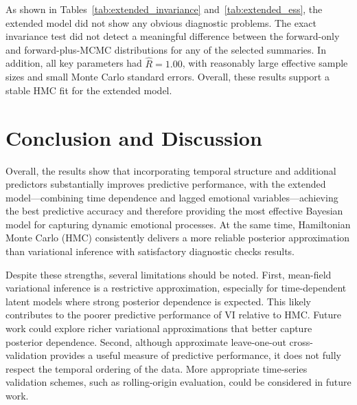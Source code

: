\documentclass[12pt,letterpaper,fleqn]{article}
\begin{document}
As shown in Tables~\ref{tab:extended_invariance} and~\ref{tab:extended_ess}, the extended model did not show any obvious diagnostic problems. The exact invariance test did not detect a meaningful difference between the forward-only and forward-plus-MCMC distributions for any of the selected summaries. In addition, all key parameters had $\hat{R}=1.00$, with reasonably large effective sample sizes and small Monte Carlo standard errors. Overall, these results support a stable HMC fit for the extended model.

\section{Conclusion and Discussion}

Overall, the results show that incorporating temporal structure and additional predictors substantially improves predictive performance, with the extended model—combining time dependence and lagged emotional variables—achieving the best predictive accuracy and therefore providing the most effective Bayesian model for capturing dynamic emotional processes. At the same time, Hamiltonian Monte Carlo (HMC) consistently delivers a more reliable posterior approximation than variational inference with satisfactory diagnostic checks results. 


Despite these strengths, several limitations should be noted. First, mean-field variational inference is a restrictive approximation, especially for time-dependent latent models where strong posterior dependence is expected. This likely contributes to the poorer predictive performance of VI relative to HMC. Future work could explore richer variational approximations that better capture posterior dependence. Second, although approximate leave-one-out cross-validation provides a useful measure of predictive performance, it does not fully respect the temporal ordering of the data. More appropriate time-series validation schemes, such as rolling-origin evaluation, could be considered in future work.
\end{document}

